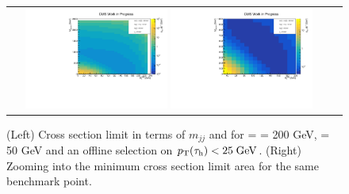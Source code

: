 \begin{figure}[tbh!]
	\centering
	\begin{tabular}{cc}
		\includegraphics[width=0.45\textwidth]{analysis/pics/JetInvMass_vs_MET_xsec_chi200_lsp050_taupt25.pdf}
		\includegraphics[width=0.45\textwidth]{analysis/pics/JetInvMass_vs_MET_xsec_chi200_lsp050_taupt25_zoom.pdf} 		
	\end{tabular}
	\caption{(Left) Cross section limit in terms of $m_{jj}$ and \met for \charginopm = \neutralinotwo = 200 GeV, \neutralinoone = 50 GeV and an offline selection on $p_{\text{T}}(\tau_{\text{h}}) <  25\;\text{Ge}\kern-0.06667em\text{V}$. (Right) Zooming into the minimum cross section limit area for the same benchmark point.}
	\label{fig::JetInvMass_vs_MET_xsec_chi200_lsp050_taupt25}
\end{figure}

